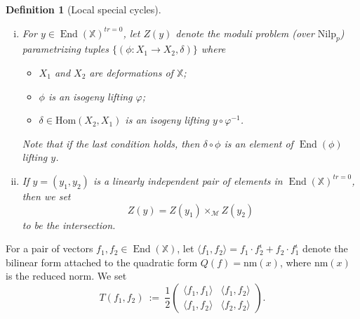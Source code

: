 \documentclass[reqno,oneside]{amsart}
\theoremstyle{plain}
\newtheorem{definition}[theorem]{Definition}
\theoremstyle{remark}
\numberwithin{theorem}{section}
\newcommand{\bbX}{\mathbb X}
\newcommand{\calM}{\mathcal M}
\newcommand{\Nilp}{\mathrm{Nilp}}
\newcommand{\Hom}{\mathrm{Hom}}
\DeclareMathOperator{\End}{End}
\begin{document}
	\begin{definition}[Local special cycles]
		\begin{enumerate}[(i)]
			\item
			For  $ y\in \End(\bbX)^{tr=0}$, let $Z(y)$ denote the moduli problem (over $\Nilp_p$) parametrizing tuples $\{ (\phi \colon X_1 \to X_2, \delta)\}$ where
			\begin{itemize}
				\item $X_1$ and $X_2$ are deformations of $\bbX$;
				\item   $\phi$ is an isogeny lifting $\varphi$;
				\item $\delta \in \Hom(X_2, X_1)$ is an isogeny lifting $y \circ \varphi^{-1}$.
			\end{itemize}
			Note that if the last condition holds, then $\delta \circ \phi$ is an element of $\End(\phi)$ lifting $y$.
			
			\item If $y = (y_1, y_2)$ is a linearly independent pair of elements in $\End(\bbX)^{tr=0}$, then we set
			\begin{equation}
			Z(y) = Z(y_1) \times_{\calM} Z(y_2)
			\end{equation}
			to be the intersection.
		\end{enumerate}
		
	\end{definition}
	
	For a pair of vectors $f_1, f_2 \in \End(\bbX)$, let $\langle f_1, f_2 \rangle = f_1 \cdot f_2 ^{\iota} + f_2 \cdot f_1^{\iota}$ denote the bilinear form attached to the quadratic form $Q(f) = \mathrm{nm}(x)$, where $\mathrm{nm}(x)$ is the reduced norm. We set
	\begin{equation} \label{eq:T}
	T(f_1, f_2) \ := \ \frac12 \begin{pmatrix} \langle f_1, f_1 \rangle & \langle f_1, f_2 \rangle \\ \langle f_1, f_2 \rangle & \langle f_2, f_2  \rangle \end{pmatrix}.
	\end{equation}
	
\end{document}
